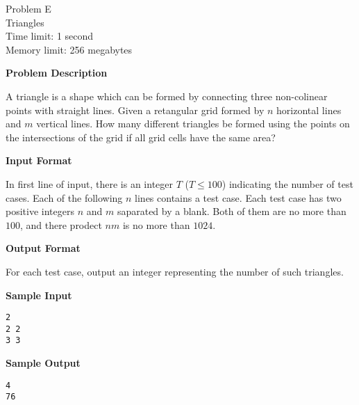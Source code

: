 \documentclass[11pt]{article}
\begin{document}
\begin{center}
    {\LARGE Problem E}\\
    {\Large Triangles}\\
    {Time limit: 1 second}\\
    {Memory limit: 256 megabytes}
\end{center}

\textbf{\large Problem Description}

A triangle is a shape which can be formed by connecting three non-colinear
points with straight lines.
Given a retangular grid formed by $n$ horizontal lines and $m$ vertical lines.
How many different triangles be formed using the points on the intersections
of the grid if all grid cells have the same area?

\textbf{\large Input Format}

In first line of input, there is an integer $T$ ($T\le 100$) indicating the
number of test cases. Each of the following $n$ lines contains a test case.
Each test case has two positive integers $n$ and $m$ saparated by a blank. Both
of them are no more than $100$, and there prodect $nm$ is no more than $1024$.

\textbf{\large Output Format}

For each test case, output an integer representing the number of such triangles.

\textbf{\large Sample Input}

\begin{verbatim}
2
2 2
3 3
\end{verbatim}

\textbf{\large Sample Output}
\begin{verbatim}
4
76
\end{verbatim}
\end{document}
